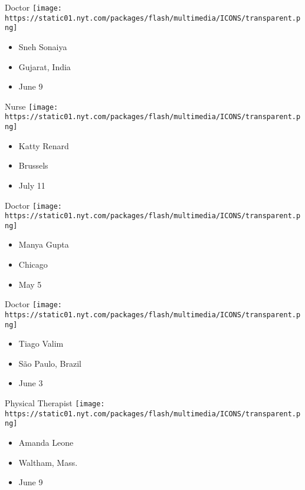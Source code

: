 \protect\hyperlink{item-sneh-sonaiya}{}

Doctor
\texttt{[image: https://static01.nyt.com/packages/flash/multimedia/ICONS/transparent.png]}

\begin{itemize}
\tightlist
\item
  Sneh Sonaiya
\item
  Gujarat, India
\item
  June 9
\end{itemize}

\protect\hyperlink{item-katty-renard}{}

Nurse
\texttt{[image: https://static01.nyt.com/packages/flash/multimedia/ICONS/transparent.png]}

\begin{itemize}
\tightlist
\item
  Katty Renard
\item
  Brussels
\item
  July 11
\end{itemize}

\protect\hyperlink{item-manya-gupta}{}

Doctor
\texttt{[image: https://static01.nyt.com/packages/flash/multimedia/ICONS/transparent.png]}

\begin{itemize}
\tightlist
\item
  Manya Gupta
\item
  Chicago
\item
  May 5
\end{itemize}

\protect\hyperlink{item-tiago-valim}{}

Doctor
\texttt{[image: https://static01.nyt.com/packages/flash/multimedia/ICONS/transparent.png]}

\begin{itemize}
\tightlist
\item
  Tiago Valim
\item
  São Paulo, Brazil
\item
  June 3
\end{itemize}

\protect\hyperlink{item-amanda-leone}{}

Physical Therapist
\texttt{[image: https://static01.nyt.com/packages/flash/multimedia/ICONS/transparent.png]}

\begin{itemize}
\tightlist
\item
  Amanda Leone
\item
  Waltham, Mass.
\item
  June 9
\end{itemize}

